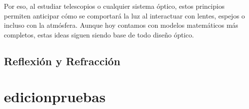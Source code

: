 \vspace{0.3cm}

Por eso, al estudiar telescopios o cualquier sistema óptico, estos principios permiten anticipar cómo se comportará la luz al interactuar con lentes, espejos o incluso con la atmósfera. Aunque hoy contamos con modelos matemáticos más completos, estas ideas siguen siendo base de todo diseño óptico.


\section{Reflexión y Refracción}


\chapter{edicionpruebas}


